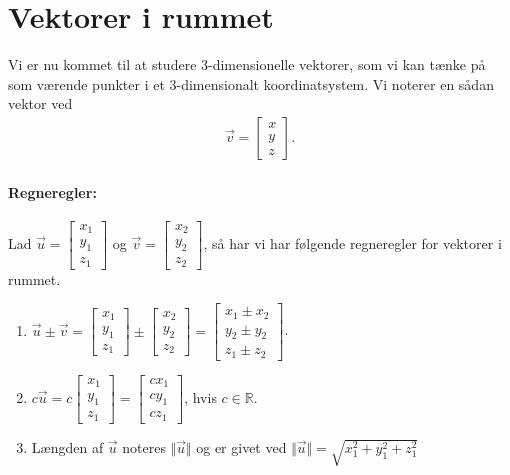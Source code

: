 \section{Vektorer i rummet}
\noindent Vi er nu kommet til at studere 3-dimensionelle vektorer, som vi kan tænke på som værende punkter i et 3-dimensionalt koordinatsystem. Vi noterer en sådan vektor ved
\begin{align*}
\vec{v}=\begin{bmatrix}
x \\
y \\
z
\end{bmatrix}.
\end{align*}
\paragraph*{Regneregler:}
Lad $\vec{u} = \begin{bmatrix} x_1 \\ y_1 \\ z_1 \end{bmatrix}$ og $\vec{v} = \begin{bmatrix} x_2 \\ y_2 \\ z_2 \end{bmatrix}$, så har vi har følgende regneregler for vektorer i rummet.
\begin{enumerate}
\item $\displaystyle \vec{u} \pm \vec{v} = \begin{bmatrix} x_1 \\ y_1 \\ z_1 \end{bmatrix} \pm \begin{bmatrix} x_2 \\ y_2 \\ z_2 \end{bmatrix} = \begin{bmatrix} x_1 \pm x_2 \\ y_2 \pm y_2 \\ z_1 \pm z_2 \end{bmatrix} $.
\item $\displaystyle c \vec{u} = c  \begin{bmatrix} x_1 \\y_1 \\ z_1 \end{bmatrix} = \begin{bmatrix} cx_1 \\ c y_1 \\ cz_1 \end{bmatrix}$, hvis $c \in \mathbb{R}$.
\item Længden af $\vec{u}$ noteres $\Vert \vec{u} \Vert$ og er givet ved $\displaystyle \Vert \vec{u} \Vert = \sqrt{x_1^2+y_1^2+z_1^2}$
\end{enumerate}


